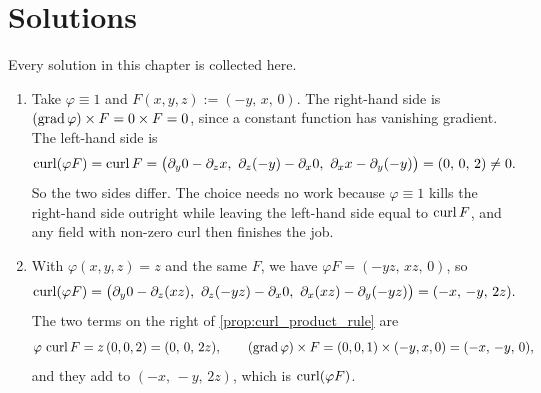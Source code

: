 
\section{Solutions}
\label{sec:vector_calculus_solutions}

Every solution in this chapter is collected here.

\begin{exercisesolution}
\label{sol:ai_curl_product_rule_counterexample}
\begin{enumerate}[label=\textbf{(\alph*)}]
  \item Take $\varphi \equiv 1$ and $F(x,y,z) := (-y,\,x,\,0)$. The right-hand side is
    $(\operatorname{grad}\varphi)\times F = 0\times F = 0$, since a constant function has vanishing gradient.
    The left-hand side is
    \[\operatorname{curl}(\varphi F) = \operatorname{curl} F
      = \big(\partial_y0 - \partial_z x,\ \partial_z(-y) - \partial_x 0,\
        \partial_x x - \partial_y(-y)\big) = (0,\,0,\,2) \neq 0.\]
    So the two sides differ. The choice needs no work because $\varphi \equiv 1$ kills the
    right-hand side outright while leaving the left-hand side equal to $\operatorname{curl} F$, and any field
    with non-zero curl then finishes the job.
  \item With $\varphi(x,y,z) = z$ and the same $F$, we have $\varphi F = (-yz,\,xz,\,0)$, so
    \[\operatorname{curl}(\varphi F)
      = \big(\partial_y0 - \partial_z(xz),\ \partial_z(-yz) - \partial_x0,\
        \partial_x(xz) - \partial_y(-yz)\big) = (-x,\,-y,\,2z).\]
    The two terms on the right of \cref{prop:curl_product_rule} are
    \[\varphi\,\operatorname{curl} F = z\,(0,0,2) = (0,\,0,\,2z),
      \qquad
      (\operatorname{grad}\varphi)\times F = (0,0,1)\times(-y,x,0) = (-x,\,-y,\,0),\]
    and they add to $(-x,\,-y,\,2z)$, which is $\operatorname{curl}(\varphi F)$.
\end{enumerate}
\end{exercisesolution}

